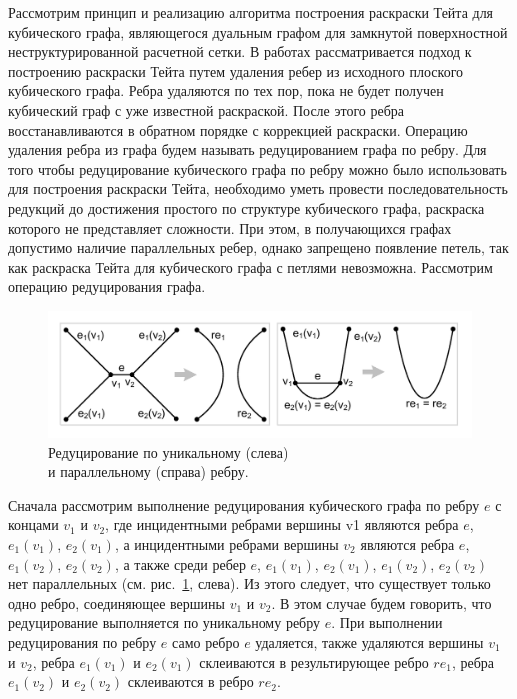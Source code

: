 Рассмотрим принцип и реализацию алгоритма построения раскраски Тейта для кубического графа, являющегося дуальным графом для замкнутой поверхностной неструктурированной расчетной сетки.
В работах \cite{Kurapov2018,Kurapov2020} рассматривается подход к построению раскраски Тейта путем удаления ребер из исходного плоского кубического графа.
Ребра удаляются по тех пор, пока не будет получен кубический граф с уже известной раскраской.
После этого ребра восстанавливаются в обратном порядке с коррекцией раскраски.
Операцию удаления ребра из графа будем называть редуцированием графа по ребру.
Для того чтобы редуцирование кубического графа по ребру можно было использовать для построения раскраски Тейта, необходимо уметь провести последовательность редукций до достижения простого по структуре кубического графа, раскраска которого не представляет сложности.
При этом, в получающихся графах допустимо наличие параллельных ребер, однако запрещено появление петель, так как раскраска Тейта для кубического графа с петлями невозможна.
Рассмотрим операцию редуцирования графа.

\begin{figure}[ht]
\centering
\includegraphics[width=1.0\textwidth]{fig/par_reduce_edge.pdf}
\singlespacing
{}\caption{Редуцирование по уникальному (слева) \\ и параллельному (справа) ребру.}
\label{fig:par_reduce_edge}
\end{figure}

Сначала рассмотрим выполнение редуцирования кубического графа по ребру $e$ с концами $v_1$ и $v_2$, где инцидентными ребрами вершины v1 являются ребра $e$, $e_1(v_1)$, $e_2(v_1)$, а инцидентными ребрами вершины $v_2$ являются ребра $e$, $e_1(v_2)$, $e_2(v_2)$, а также среди ребер $e$, $e_1(v_1)$, $e_2(v_1)$, $e_1(v_2)$, $e_2(v_2)$ нет параллельных (см. рис.~\ref{fig:par_reduce_edge}, слева).
Из этого следует, что существует только одно ребро, соединяющее вершины $v_1$ и $v_2$.
В этом случае будем говорить, что редуцирование выполняется по уникальному ребру $e$.
При выполнении редуцирования по ребру $e$ само ребро $e$ удаляется, также удаляются вершины $v_1$ и $v_2$, ребра $e_1(v_1)$ и $e_2(v_1)$ склеиваются в результирующее ребро $re_1$, ребра $e_1(v_2)$ и $e_2(v_2)$ склеиваются в ребро $re_2$.

